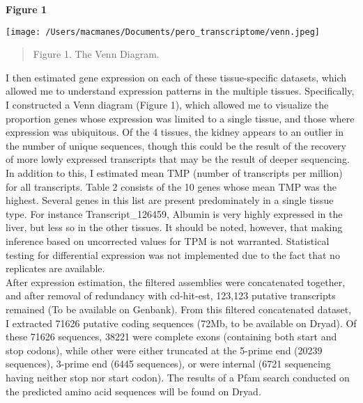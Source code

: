 \documentclass[11pt]{article}
\begin{document}
\textbf{\hypertarget{Figure 1}{Figure 1}} \\
\centerline{\texttt{[image: /Users/macmanes/Documents/pero\_transcriptome/venn.jpeg]}}
\begin{quote}
\small{Figure 1. The Venn Diagram.}
\end{quote}   

I then estimated gene expression on each of these tissue-specific datasets, which allowed me to understand expression patterns in the multiple tissues. Specifically, I constructed a Venn diagram ({\hypertarget{Figure 1}{Figure 1}}), which allowed me to visualize the proportion genes whose expression was limited to a single tissue, and those where expression was ubiquitous. Of the 4 tissues, the kidney appears to an outlier in the number of unique sequences, though this could be the result of the recovery of more lowly expressed transcripts that may be the result of deeper sequencing.  \\

In addition to this, I estimated mean TMP (number of transcripts per million) for all transcripts. {\hypertarget{Table 2}{Table 2}} consists of the 10 genes whose mean TMP was the highest. Several genes in this list are present predominately in a single tissue type. For instance Transcript\_126459, Albumin is very highly expressed in the liver, but less so in the other tissues. It should be noted, however, that making inference based on uncorrected values for TPM is not warranted. Statistical testing for differential expression was not implemented due to the fact that no replicates are available.  \\  

After expression estimation, the filtered assemblies were concatenated together, and after removal of redundancy with cd-hit-est, 123,123 putative transcripts remained (To be available on Genbank). From this filtered concatenated dataset, I extracted 71626 putative coding sequences (72Mb, to be available on Dryad). Of these 71626 sequences, 38221 were complete exons (containing both start and stop codons), while other were either truncated at the 5-prime end (20239 sequences), 3-prime end (6445 sequences), or were internal (6721 sequencing having neither stop nor start codon). The results of a Pfam search conducted on the predicted amino acid sequences will be found on Dryad. \\
\end{document}
